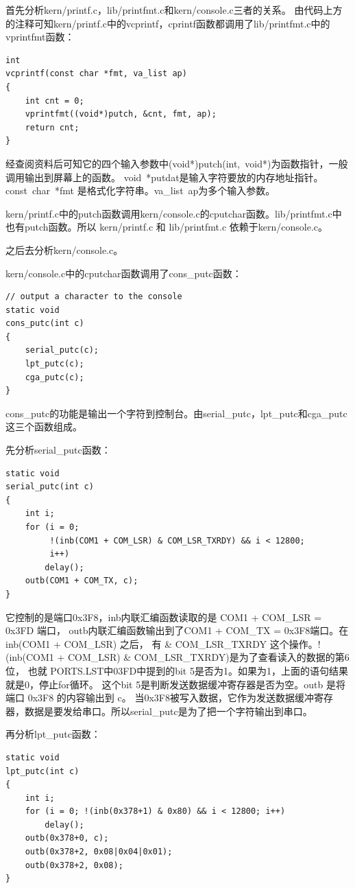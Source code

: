 \documentclass[12pt,a4paper,UTF8]{article}
\begin{document}
首先分析kern/printf.c，lib/printfmt.c和kern/console.c三者的关系。
由代码上方的注释可知kern/printf.c中的vcprintf，cprintf函数都调用了lib/printfmt.c中的vprintfmt函数：

\begin{lstlisting}[style=CPP]
int
vcprintf(const char *fmt, va_list ap)
{
	int cnt = 0;
	vprintfmt((void*)putch, &cnt, fmt, ap);
	return cnt;
}    
\end{lstlisting}

经查阅资料后可知它的四个输入参数中(void*)putch(int,\ void*)为函数指针，一般调用输出到屏幕上的函数。
void\ *putdat是输入字符要放的内存地址指针。const\ char\ *fmt 是格式化字符串。va\_list\ ap为多个输入参数。

kern/printf.c中的putch函数调用kern/console.c的cputchar函数。lib/printfmt.c中也有putch函数。所以 kern/printf.c 和 lib/printfmt.c 依赖于kern/console.c。

之后去分析kern/console.c。

kern/console.c中的cputchar函数调用了cons\_putc函数：

\begin{lstlisting}[style=CPP]
// output a character to the console
static void
cons_putc(int c)
{
	serial_putc(c);
	lpt_putc(c);
	cga_putc(c);
}
\end{lstlisting}

cons\_putc的功能是输出一个字符到控制台。由serial\_putc，lpt\_putc和cga\_putc这三个函数组成。

先分析serial\_putc函数：

\begin{lstlisting}[style=CPP]
static void
serial_putc(int c)
{
	int i;
	for (i = 0;
	     !(inb(COM1 + COM_LSR) & COM_LSR_TXRDY) && i < 12800;
	     i++)
		delay();
	outb(COM1 + COM_TX, c);
}
\end{lstlisting}

它控制的是端口0x3F8，inb内联汇编函数读取的是 COM1 + COM\_LSR = 0x3FD 端口，
outb内联汇编函数输出到了COM1 + COM\_TX = 0x3F8端口。在 inb(COM1 + COM\_LSR) 之后，
有 \& COM\_LSR\_TXRDY 这个操作。!(inb(COM1 + COM\_LSR) \& COM\_LSR\_TXRDY)是为了查看读入的数据的第6位，
也就 PORTS.LST中03FD中提到的bit 5是否为1。如果为1，上面的语句结果就是0，停止for循环。
这个bit 5是判断发送数据缓冲寄存器是否为空。outb 是将端口 0x3F8 的内容输出到 c。
当0x3F8被写入数据，它作为发送数据缓冲寄存器，数据是要发给串口。所以serial\_putc是为了把一个字符输出到串口。

再分析lpt\_putc函数：

\begin{lstlisting}[style=CPP]
static void
lpt_putc(int c)
{
	int i;
	for (i = 0; !(inb(0x378+1) & 0x80) && i < 12800; i++)
		delay();
	outb(0x378+0, c);
	outb(0x378+2, 0x08|0x04|0x01);
	outb(0x378+2, 0x08);
}
\end{lstlisting}
\end{document}
